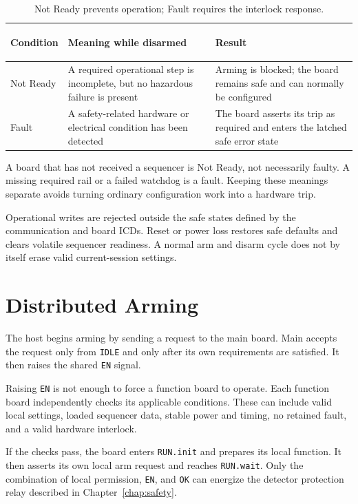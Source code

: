 \begin{table}[htbp]
\centering
\begin{tabularx}{\textwidth}{@{}>{\bfseries\raggedright\arraybackslash}p{}>{\raggedright\arraybackslash}p{}>{\raggedright\arraybackslash}X@{}}
\toprule
Condition & Meaning while disarmed & Result \\
\midrule
Not Ready & A required operational step is incomplete, but no hazardous failure is present & Arming is blocked; the board remains safe and can normally be configured \\
Fault & A safety-related hardware or electrical condition has been detected & The board asserts its trip as required and enters the latched safe error state \\
\bottomrule
\end{tabularx}
\caption{Not Ready prevents operation; Fault requires the interlock response.}
\label{tab:not-ready-fault}
\end{table}

A board that has not received a sequencer is Not Ready, not necessarily faulty. A missing required rail or a failed watchdog is a fault. Keeping these meanings separate avoids turning ordinary configuration work into a hardware trip.

Operational writes are rejected outside the safe states defined by the communication and board ICDs. Reset or power loss restores safe defaults and clears volatile sequencer readiness. A normal arm and disarm cycle does not by itself erase valid current-session settings.

\section{Distributed Arming}

The host begins arming by sending a request to the main board. Main accepts the request only from \texttt{IDLE} and only after its own requirements are satisfied. It then raises the shared \texttt{EN} signal.

Raising \texttt{EN} is not enough to force a function board to operate. Each function board independently checks its applicable conditions. These can include valid local settings, loaded sequencer data, stable power and timing, no retained fault, and a valid hardware interlock.

If the checks pass, the board enters \texttt{RUN.init} and prepares its local function. It then asserts its own local arm request and reaches \texttt{RUN.wait}. Only the combination of local permission, \texttt{EN}, and \texttt{OK} can energize the detector protection relay described in Chapter~\ref{chap:safety}.

